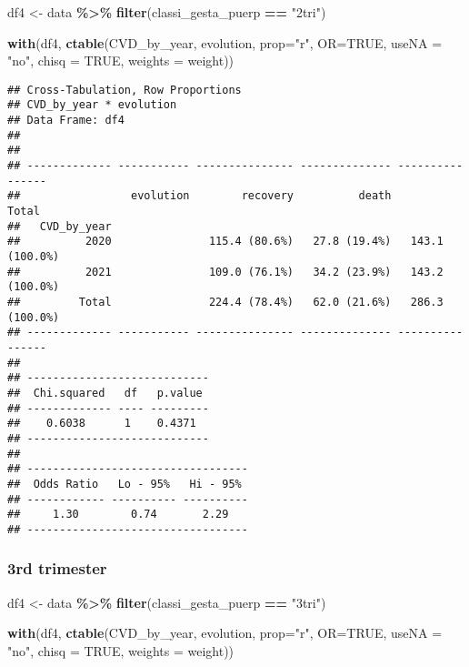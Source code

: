 \documentclass[
]{article}
\newenvironment{Shaded}{\begin{snugshade}}{\end{snugshade}}
\newcommand{\AttributeTok}[1]{\textcolor[rgb]{0.13,0.29,0.53}{#1}}
\newcommand{\ConstantTok}[1]{\textcolor[rgb]{0.56,0.35,0.01}{#1}}
\newcommand{\FunctionTok}[1]{\textcolor[rgb]{0.13,0.29,0.53}{\textbf{#1}}}
\newcommand{\NormalTok}[1]{#1}
\newcommand{\OtherTok}[1]{\textcolor[rgb]{0.56,0.35,0.01}{#1}}
\newcommand{\SpecialCharTok}[1]{\textcolor[rgb]{0.81,0.36,0.00}{\textbf{#1}}}
\newcommand{\StringTok}[1]{\textcolor[rgb]{0.31,0.60,0.02}{#1}}
\begin{document}
\begin{Shaded}
\begin{Highlighting}[]
\NormalTok{df4 }\OtherTok{\textless{}{-}}\NormalTok{ data }\SpecialCharTok{\%\textgreater{}\%} 
  \FunctionTok{filter}\NormalTok{(classi\_gesta\_puerp }\SpecialCharTok{==} \StringTok{"2tri"}\NormalTok{)}

\FunctionTok{with}\NormalTok{(df4, }\FunctionTok{ctable}\NormalTok{(CVD\_by\_year, evolution, }\AttributeTok{prop=}\StringTok{"r"}\NormalTok{, }\AttributeTok{OR=}\ConstantTok{TRUE}\NormalTok{, }\AttributeTok{useNA =} \StringTok{"no"}\NormalTok{, }\AttributeTok{chisq =} \ConstantTok{TRUE}\NormalTok{, }\AttributeTok{weights =}\NormalTok{ weight))}
\end{Highlighting}
\end{Shaded}

\begin{verbatim}
## Cross-Tabulation, Row Proportions  
## CVD_by_year * evolution  
## Data Frame: df4  
## 
## 
## ------------- ----------- --------------- -------------- ----------------
##                 evolution        recovery          death            Total
##   CVD_by_year                                                            
##          2020               115.4 (80.6%)   27.8 (19.4%)   143.1 (100.0%)
##          2021               109.0 (76.1%)   34.2 (23.9%)   143.2 (100.0%)
##         Total               224.4 (78.4%)   62.0 (21.6%)   286.3 (100.0%)
## ------------- ----------- --------------- -------------- ----------------
## 
## ----------------------------
##  Chi.squared   df   p.value 
## ------------- ---- ---------
##    0.6038      1    0.4371  
## ----------------------------
## 
## ----------------------------------
##  Odds Ratio   Lo - 95%   Hi - 95% 
## ------------ ---------- ----------
##     1.30        0.74       2.29   
## ----------------------------------
\end{verbatim}

\hypertarget{rd-trimester-11}{%
\subsubsection{3rd trimester}\label{rd-trimester-11}}

\begin{Shaded}
\begin{Highlighting}[]
\NormalTok{df4 }\OtherTok{\textless{}{-}}\NormalTok{ data }\SpecialCharTok{\%\textgreater{}\%} 
  \FunctionTok{filter}\NormalTok{(classi\_gesta\_puerp }\SpecialCharTok{==} \StringTok{"3tri"}\NormalTok{)}

\FunctionTok{with}\NormalTok{(df4, }\FunctionTok{ctable}\NormalTok{(CVD\_by\_year, evolution, }\AttributeTok{prop=}\StringTok{"r"}\NormalTok{, }\AttributeTok{OR=}\ConstantTok{TRUE}\NormalTok{, }\AttributeTok{useNA =} \StringTok{"no"}\NormalTok{, }\AttributeTok{chisq =} \ConstantTok{TRUE}\NormalTok{, }\AttributeTok{weights =}\NormalTok{ weight))}
\end{Highlighting}
\end{Shaded}
\end{document}
